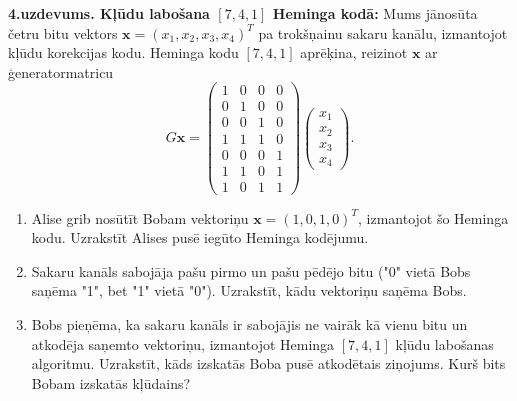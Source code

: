 \documentclass[a4paper,12pt]{article}
\begin{document}
\vspace{6pt}
{\bf 4.uzdevums. Kļūdu labošana $[7,4,1]$ Heminga kodā:} 
Mums jānosūta četru bitu vektors $\mathbf{x}=(x_1,x_2,x_3,x_4)^T$ 
pa trokšņainu sakaru kanālu, izmantojot kļūdu korekcijas kodu. 
Heminga kodu  $[7,4,1]$ aprēķina, reizinot $\mathbf{x}$ ar 
ģeneratormatricu
$$G\mathbf{x} = \left(
\begin{array}{cccc}
1 & 0 & 0 & 0 \\
0 & 1 & 0 & 0 \\
0 & 0 & 1 & 0 \\
1 & 1 & 1 & 0 \\
0 & 0 & 0 & 1 \\
1 & 1 & 0 & 1 \\
1 & 0 & 1 & 1 
\end{array} \right) \left( \begin{array}{c}
x_1\\
x_2\\
x_3\\
x_4
\end{array} \right).$$
\begin{enumerate}
\item Alise grib nosūtīt Bobam vektoriņu $\mathbf{x} = (1,0,1,0)^T$, izmantojot šo Heminga kodu.
Uzrakstīt Alises pusē iegūto Heminga kodējumu.
\item Sakaru kanāls sabojāja pašu pirmo un pašu pēdējo bitu ("0" vietā Bobs saņēma "1",
bet "1" vietā "0"). Uzrakstīt, kādu vektoriņu saņēma Bobs.
\item Bobs pieņēma, ka sakaru kanāls ir sabojājis ne vairāk kā vienu bitu un atkodēja
saņemto vektoriņu, izmantojot Heminga $[7,4,1]$ kļūdu labošanas algoritmu. 
Uzrakstīt, kāds izskatās Boba pusē atkodētais ziņojums.
Kurš bits Bobam izskatās kļūdains?
\end{enumerate}
\end{document}
